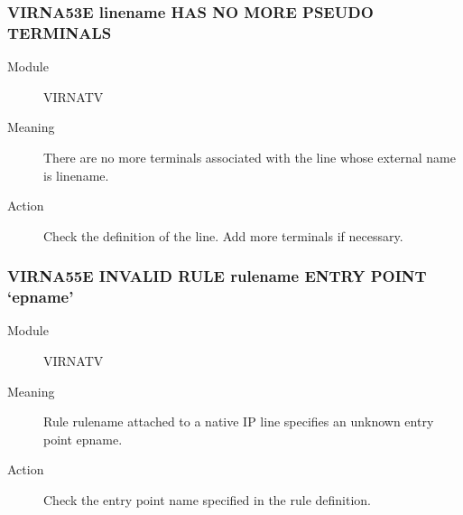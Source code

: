 \documentclass[letterpaper,10pt,english]{sphinxmanual}
\begin{document}
\subsubsection{VIRNA53E linename HAS NO MORE PSEUDO TERMINALS}
\label{\detokenize{messages:virna53e-linename-has-no-more-pseudo-terminals}}\begin{description}
\item[{Module}] \leavevmode
VIRNATV

\item[{Meaning}] \leavevmode
There are no more terminals associated with the line whose external name is linename.

\item[{Action}] \leavevmode
Check the definition of the line. Add more terminals if necessary.

\end{description}


\subsubsection{VIRNA55E INVALID RULE rulename ENTRY POINT ‘epname’}
\label{\detokenize{messages:virna55e-invalid-rule-rulename-entry-point-epname}}\begin{description}
\item[{Module}] \leavevmode
VIRNATV

\item[{Meaning}] \leavevmode
Rule rulename attached to a native IP line specifies an unknown entry point epname.

\item[{Action}] \leavevmode
Check the entry point name specified in the rule definition.

\end{description}
\end{document}
